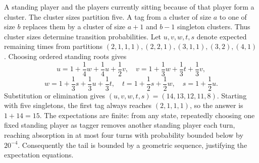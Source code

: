 A standing player and the players currently sitting because of that player form a cluster. The cluster sizes partition five. A tag from a cluster of size $a$ to one of size $b$ replaces them by a cluster of size $a+1$ and $b-1$ singleton clusters. Thus cluster sizes determine transition probabilities. Let $u,v,w,t,s$ denote expected remaining times from partitions $(2,1,1,1),(2,2,1),(3,1,1),(3,2),(4,1)$. Choosing ordered standing roots gives
\[u=1+\dfrac{1}{4}w+\dfrac{1}{4}u+\dfrac{1}{2}v,\quad v=1+\dfrac{1}{3}w+\dfrac{1}{3}t+\dfrac{1}{3}v,\]
\[w=1+\dfrac{1}{3}s+\dfrac{1}{3}u+\dfrac{1}{3}t,\quad t=1+\dfrac{1}{2}s+\dfrac{1}{2}w,\quad s=1+\dfrac{1}{2}u.\]
Substitution or elimination gives $(u,v,w,t,s)=(14,13,12,11,8)$. Starting with five singletons, the first tag always reaches $(2,1,1,1)$, so the answer is $\boxed{1+14=15}$. The expectations are finite: from any state, repeatedly choosing one fixed standing player as tagger removes another standing player each turn, reaching absorption in at most four turns with probability bounded below by $20^{-4}$. Consequently the tail is bounded by a geometric sequence, justifying the expectation equations.
